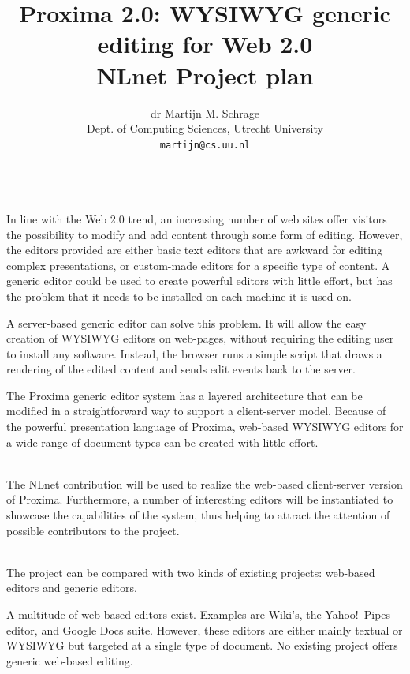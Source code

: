 \documentclass[10pt]{article}
\title{Proxima 2.0: WYSIWYG generic editing for Web 2.0\\
\bigskip
        \large NLnet Project plan}
\author{dr Martijn M. Schrage\\
        \small Dept. of Computing Sciences, Utrecht University\\
        \small {\tt martijn@cs.uu.nl}
        }
\date{}
\begin{document}
\maketitle


\\
In line with the Web 2.0 trend, an increasing number of web sites offer visitors the possibility to modify and add content through some form of editing. However, the editors provided are either basic text editors that are awkward for editing complex presentations, or custom-made editors for a specific type of content. A generic editor could be used to create powerful editors with little effort, but has the problem that it needs to be installed on each machine it is used on.

A server-based generic editor can solve this problem. It will allow the easy creation of WYSIWYG editors on web-pages, without requiring the editing user to install any software. Instead, the browser runs a simple script that draws a rendering of the edited content and sends edit events back to the server.

The Proxima generic editor system has a layered architecture that can be modified in a straightforward way to support a client-server model. Because of the powerful presentation language of Proxima, web-based WYSIWYG editors for a wide range of document types can be created with little effort.

\\
The NLnet contribution will be used to realize the web-based client-server version of Proxima. Furthermore, a number of interesting editors will be instantiated to showcase the capabilities of the system, thus helping to  attract the attention of possible contributors to the project.


\\
The project can be compared with two kinds of existing projects: web-based editors and generic editors.

A multitude of web-based editors exist. Examples are Wiki's, the Yahoo!\ Pipes editor, and Google Docs suite. However, these editors are either mainly textual or WYSIWYG but targeted at a single type of document. No existing project offers generic web-based editing. 
\end{document}

